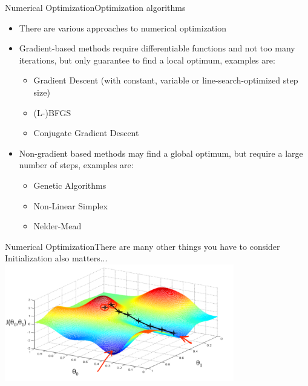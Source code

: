 \begin{frame}{Numerical Optimization}{Optimization algorithms}
	\begin{itemize}
		\item There are various approaches to numerical optimization
		\item Gradient-based methods require differentiable functions and not too many iterations, but only guarantee to find a local optimum, examples are:
		\begin{itemize}
			\item Gradient Descent (with constant, variable or line-search-optimized step size)
			\item (L-)BFGS
			\item Conjugate Gradient Descent
		\end{itemize}
		\item Non-gradient based methods may find a global optimum, but require a large number of steps, examples are:
		\begin{itemize}
			\item Genetic Algorithms
			\item Non-Linear Simplex
			\item Nelder-Mead
		\end{itemize}
	\end{itemize}
\end{frame}

\begin{frame}{Numerical Optimization}{There are many other things you have to consider}
Initialization also matters...
\includegraphics[width=0.75\textwidth]{02_math/02_img/gradientascent.png}
\end{frame}

